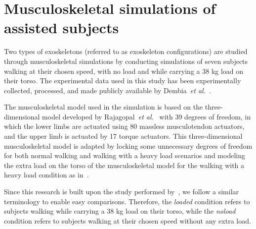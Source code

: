 \documentclass[10pt,letterpaper]{article}
\newcommand{\etal}{\textit{et al.}}
\begin{document}
\section*{Musculoskeletal simulations of assisted subjects}



Two types of exoskeletons (referred to as exoskeleton configurations) are studied through musculoskeletal simulations by conducting simulations of seven subjects walking at their chosen speed, with no load and while carrying a 38 kg load on their torso. The experimental data used in this study has been experimentally collected, processed, and made publicly available by Dembia~\etal~\cite{Dembia2017}.

The musculoskeletal model used in the simulation is  based on the three-dimensional model developed by Rajagopal~\etal~\cite{Rajagopal2016} with 39 degrees of freedom, in which the lower limbs are actuated using 80 massless musculotendon actuators, and the upper limb is actuated by 17 torque actuators. This three-dimensional musculoskeletal model is adapted by locking some unnecessary degrees of freedom for both normal walking and walking with a heavy load scenarios and modeling the extra load on the torso of the musculoskeletal model for the walking with a heavy load condition as in~\cite{Dembia2017}.

Since this research is built upon the study performed by~\cite{Dembia2017}, we follow a similar terminology to enable easy comparisons. Therefore, the \textit{loaded} condition refers to subjects walking while carrying a 38 kg load on their torso, while the \textit{noload} condition refers to subjects walking  at their chosen speed without any extra load.
\end{document}
